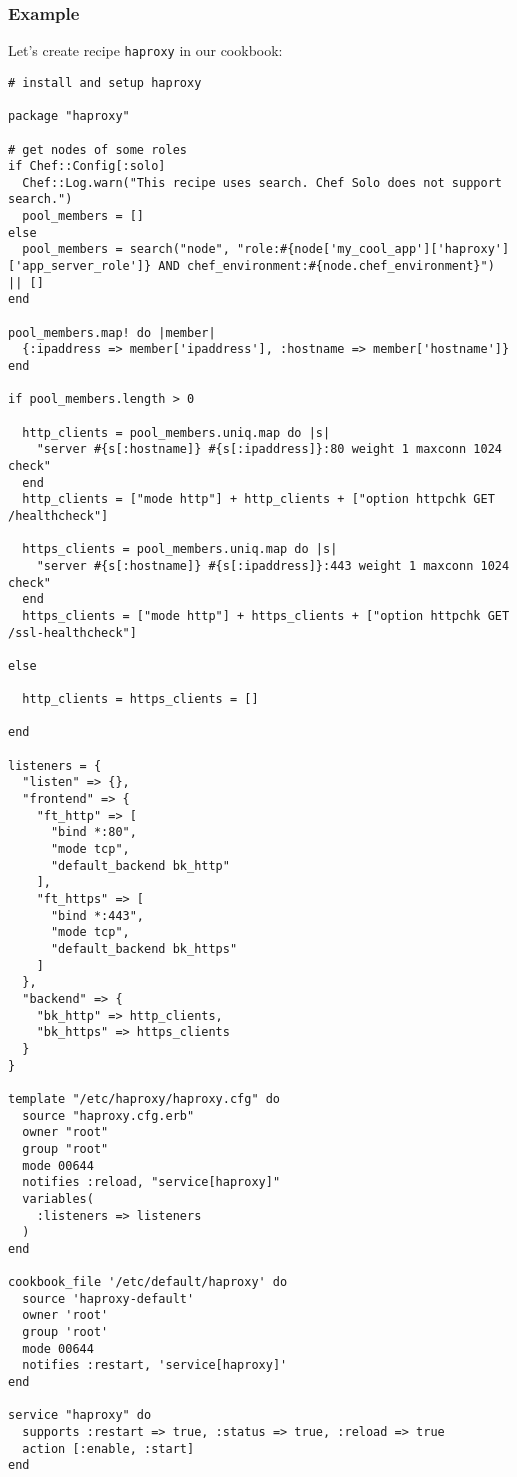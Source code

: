 \subsubsection{Example}

Let's create recipe \lstinline!haproxy! in our cookbook:

\begin{lstlisting}[label=lst:testing-chef-zero12]
# install and setup haproxy

package "haproxy"

# get nodes of some roles
if Chef::Config[:solo]
  Chef::Log.warn("This recipe uses search. Chef Solo does not support search.")
  pool_members = []
else
  pool_members = search("node", "role:#{node['my_cool_app']['haproxy']['app_server_role']} AND chef_environment:#{node.chef_environment}") || []
end

pool_members.map! do |member|
  {:ipaddress => member['ipaddress'], :hostname => member['hostname']}
end

if pool_members.length > 0

  http_clients = pool_members.uniq.map do |s|
    "server #{s[:hostname]} #{s[:ipaddress]}:80 weight 1 maxconn 1024 check"
  end
  http_clients = ["mode http"] + http_clients + ["option httpchk GET /healthcheck"]

  https_clients = pool_members.uniq.map do |s|
    "server #{s[:hostname]} #{s[:ipaddress]}:443 weight 1 maxconn 1024 check"
  end
  https_clients = ["mode http"] + https_clients + ["option httpchk GET /ssl-healthcheck"]

else

  http_clients = https_clients = []

end

listeners = {
  "listen" => {},
  "frontend" => {
    "ft_http" => [
      "bind *:80",
      "mode tcp",
      "default_backend bk_http"
    ],
    "ft_https" => [
      "bind *:443",
      "mode tcp",
      "default_backend bk_https"
    ]
  },
  "backend" => {
    "bk_http" => http_clients,
    "bk_https" => https_clients
  }
}

template "/etc/haproxy/haproxy.cfg" do
  source "haproxy.cfg.erb"
  owner "root"
  group "root"
  mode 00644
  notifies :reload, "service[haproxy]"
  variables(
    :listeners => listeners
  )
end

cookbook_file '/etc/default/haproxy' do
  source 'haproxy-default'
  owner 'root'
  group 'root'
  mode 00644
  notifies :restart, 'service[haproxy]'
end

service "haproxy" do
  supports :restart => true, :status => true, :reload => true
  action [:enable, :start]
end
\end{lstlisting}

